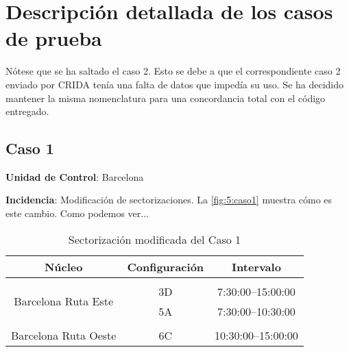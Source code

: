 \graphicspath{{anexos/AnexoD-Tabla-Casos/recursos/}}

\section{Descripción detallada de los casos de prueba} \label{Anexo:tabla-casos}

Nótese que se ha saltado el caso 2. Esto se debe a que el correspondiente caso 2 enviado por \gls{CRIDA} tenía una falta de datos que impedía su uso. Se ha decidido mantener la misma nomenclatura para una concordancia total con el código entregado.





\subsection{Caso 1}

\textbf{Unidad de Control}: Barcelona

\textbf{Incidencia}: Modificación de sectorizaciones. La \autoref{fig:5:caso1} muestra cómo es este cambio.
Como podemos ver...



\begin{table}[h]
	\centering
	\caption{Sectorización modificada del Caso 1}
	\begin{tabular}{ccc}
		\hline
		\textbf{Núcleo}                                           & \textbf{Configuración} & \textbf{Intervalo}   \\ \hline
		\multicolumn{1}{l}{}                                      & \multicolumn{1}{l}{}   & \multicolumn{1}{l}{} \\
		\multicolumn{1}{c|}{\multirow{2}{*}{Barcelona Ruta Este}} & 3D                     & 7:30:00--15:00:00    \\
		\multicolumn{1}{c|}{}                                     & 5A                     & 7:30:00--10:30:00    \\
		\multicolumn{1}{l}{}                                      & \multicolumn{1}{l}{}   & \multicolumn{1}{l}{} \\
		Barcelona Ruta Oeste                                      & 6C                     & 10:30:00--15:00:00   \\ \hline
	\end{tabular}
	\label{table:5:caso1-modif}
\end{table}


